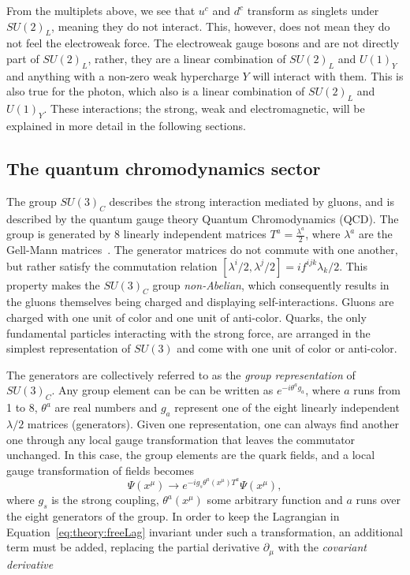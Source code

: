 From the multiplets above, we see that $u^c$ and $d^c$ transform as singlets under $SU(2)_L$, meaning they do not interact. This, however, does not mean they do not feel the electroweak force. The electroweak gauge bosons \PW and \PZ are not directly part of $SU(2)_L$, rather, they are a linear combination of $SU(2)_L$ and $U(1)_Y$ and anything with a non-zero weak hypercharge $Y$ will interact with them. This is also true for the photon, which also is a linear combination of $SU(2)_L$ and $U(1)_Y$. These interactions; the strong, weak and electromagnetic, will be explained in more detail in the following sections.

\subsection{The quantum chromodynamics sector}
\label{sec:theory:qcd}
The group $SU(3)_C$ describes the strong interaction mediated by gluons, and is described by the quantum gauge theory Quantum Chromodynamics (QCD). The group is generated by 8 linearly independent matrices $T^a=\frac{\lambda^a}{2}$, where $\lambda^a$ are the Gell-Mann matrices~\cite{PhysRev.125.1067}. The generator matrices do not commute with one another, but rather satisfy the commutation relation $[\lambda^i/2,\lambda^j/2]=i f^{ijk} \lambda_k/2$. This property makes the $SU(3)_C$ group \emph{non-Abelian}, which consequently results in the gluons themselves being charged and displaying self-interactions. Gluons are charged with one unit of color and one unit of anti-color. Quarks, the only fundamental particles interacting with the strong force, are arranged in the simplest representation of $SU(3)$ and come with one unit of color or anti-color. \par
The generators are collectively referred to as the \emph{group representation} of $SU(3)_C$. Any group element can be can be written as $e^{-i\theta^a g_a}$, where $a$ runs from 1 to 8, $\theta^a$ are real numbers and $g_a$ represent one of the eight linearly independent $\lambda/2$ matrices (generators). Given one representation, one can always find another one through any local gauge transformation that leaves the commutator unchanged.  
In this case, the group elements are the quark fields, and a local gauge transformation of fields becomes
\begin{equation}
  \Psi(x^{\mu}) \rightarrow e^{ -i g_s \theta^a(x^{\mu}) T^a}\Psi(x^{\mu}),
\end{equation}
where $g_s$ is the strong coupling, $\theta^a(x^{\mu})$ some arbitrary function and $a$ runs over the eight generators of the group. In order to keep the Lagrangian in Equation~\ref{eq:theory:freeLag} invariant under such a transformation, an additional term must be added, replacing the partial derivative $\partial_{\mu}$ with the \emph{covariant derivative}
